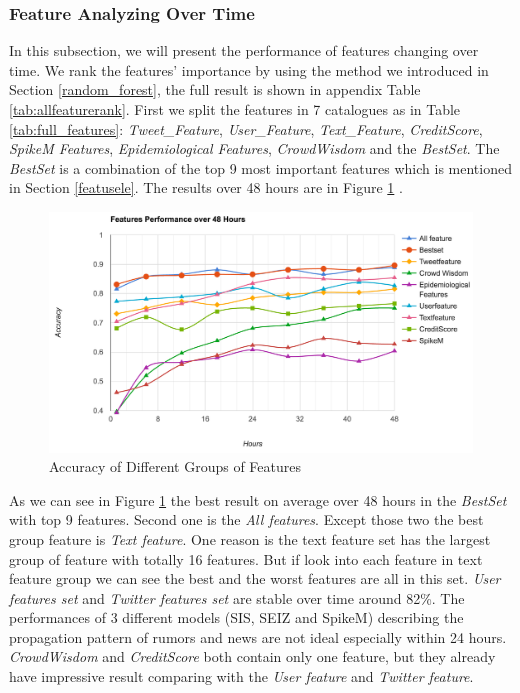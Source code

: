  
  \newpage
 \subsubsection{Feature Analyzing Over Time} 
 \label{featureanalyzing}
 In this subsection, we will present the performance of features changing over time. We rank the features' importance by using the method we introduced in Section \ref{random_forest}, the full result is shown in appendix Table \ref{tab:allfeaturerank}. First we split the features in 7 catalogues as in Table \ref{tab:full_features}: \emph{Tweet\_Feature}, \emph{User\_Feature}, \emph{Text\_Feature},  \emph{CreditScore}, \emph{SpikeM Features}, \emph{Epidemiological Features}, \emph{CrowdWisdom} and the \emph{BestSet}. The \emph{BestSet} is a combination of the top 9 most important features which is mentioned in Section \ref{featusele}. The results over 48 hours are in Figure \ref{fig:allfeature} .
 

 \begin{figure}[!h]
\centering
\includegraphics[width=\columnwidth]{images/allfeatures.png}
\caption{Accuracy of Different Groups of Features}
\label{fig:allfeature}
\end{figure}
 
 As we can see in Figure \ref{fig:allfeature} the best result on average over 48 hours in the \emph{BestSet} with top 9 features. Second one is the \emph{All features}. Except those two the best group feature is \emph{Text feature}. One reason is the text feature set has the largest group of feature with totally 16 features. But if look into each feature in text feature group we can see the best and the worst features are all in this set. \emph{User features set} and \emph{Twitter features set} are stable over time around 82\%. The performances of 3 different models (SIS, SEIZ and SpikeM) describing the propagation pattern of rumors and news are not ideal especially within 24 hours. \emph{CrowdWisdom} and \emph{CreditScore} both contain only one feature, but they already have impressive result comparing with the \emph{User feature} and \emph{Twitter feature}.
